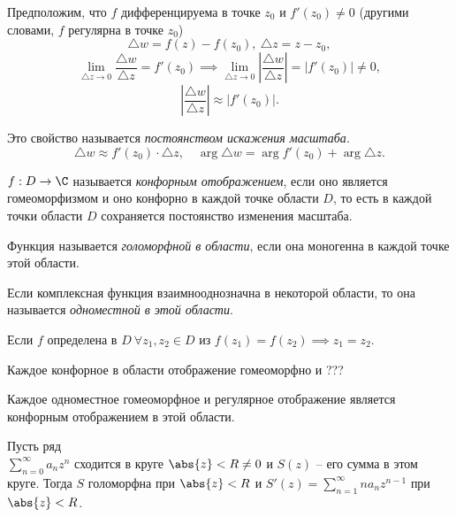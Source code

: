 \begin{remark}
	Предположим, что $f$ дифференцируема в точке $z_0$ и $f' (z_0) \ne 0$ (другими словами, $f$ регулярна в точке $z_0$)
	\[
		\triangle w = f(z) - f(z_0), \ \triangle z = z - z_0,
	\]
	\[
		\underset{\triangle z \rightarrow 0}{\lim} \frac{\triangle w}{\triangle z} = f'(z_0) \implies \underset{\triangle z \rightarrow 0}{\lim} \left|\frac{\triangle w}{\triangle z} \right| = \big|f'(z_0)\big| \ne 0,
	\]
	\[
		\left|\frac{\triangle w}{\triangle z} \right| \approx \big|f'(z_0)\big|.
	\]

	Это свойство называется \emph{постоянством искажения масштаба}.
	\[
		\triangle w \approx f'(z_0) \cdot \triangle z, \quad \arg\triangle w = \arg f' (z_0) + \arg \triangle z.
	\]
\end{remark}

\begin{definition}
	$f : D \rightarrow \C$ называется \emph{конфорным отображением}, если оно является гомеоморфизмом и оно конфорно в каждой точке области $D$, то есть в каждой точки области $D$ сохраняется постоянство изменения масштаба.
\end{definition}

\begin{definition}
	Функция называется \emph{голоморфной в области}, если она моногенна в каждой точке этой области.
\end{definition}

\begin{definition}
	Если комплексная функция взаимнооднозначна в некоторой области, то она называется \emph{одноместной в этой области}.

	Если $f$ определена в $D \ \forall z_1,z_2 \in D$ из $f(z_1) = f(z_2) \implies z_1 = z_2$.
\end{definition}

\begin{theorem}
	Каждое конфорное в области отображение гомеоморфно и ???
\end{theorem}

\begin{theorem}
	Каждое одноместное гомеоморфное и регулярное отображение является конфорным отображением в этой области.
\end{theorem}

\begin{theorem}
	Пусть ряд \\ $\sum_{n=0}^{\infty } a_nz^n$ сходится в круге $\abs{z} < R \ne 0$ и $S(z)$ -- его сумма в этом круге. Тогда $S$ голоморфна при $\abs{z} < R$ и $S' (z) = \sum_{n=1}^{\infty } na_n z^{n-1} $ при $\abs{z} < R$.
\end{theorem}

